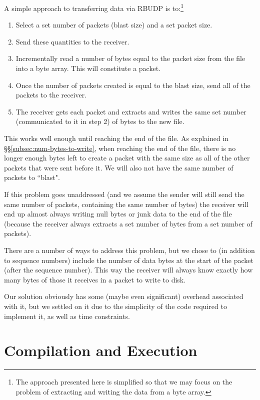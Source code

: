 \documentclass[10pt, a4paper]{article}
\begin{document}
A simple approach to transferring data via RBUDP is to:\footnote{The approach
presented here is simplified so that we may focus on the problem of
extracting and writing the data from a byte array.}
\begin{enumerate}
  \item Select a set number of packets (blast size) and a set packet size.
  \item Send these quantities to the receiver.
  \item Incrementally read a number of bytes equal to the packet size from the
    file into a byte array. This will constitute a packet.
  \item Once the number of packets created is equal to the blast size, send all
    of the packets to the receiver.
  \item The receiver gets each packet and extracts and writes the same set
    number (communicated to it in step 2) of bytes to the new file.
\end{enumerate}
This works well enough until reaching the end of the file. As explained in
\S\S\ref{subsec:num-bytes-to-write}, when reaching the end of the file, there is
no longer enough bytes left to create a packet with the same size as all of the
other packets that were sent before it. We will also not have the same number of
packets to ``blast".

If this problem goes unaddressed (and we assume the sender
will still send the same number of packets, containing the same number of bytes)
the receiver will end up almost always writing null bytes or junk data to the
end of the file (because the receiver always extracts a set number of bytes
from a set number of packets).

There are a number of ways to address this problem, but we chose to (in addition
to sequence numbers) include the number of data bytes at the start of the packet
(after the sequence number). This way the receiver will always know exactly how
many bytes of those it receives in a packet to write to disk.

Our solution obviously has some (maybe even significant) overhead associated
with it, but we settled on it due to the simplicity of the code required to
implement it, as well as time constraints.


\section{Compilation and Execution}
\label{sec:comp-exec}
\end{document}

